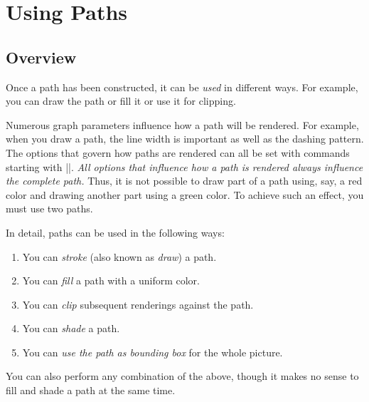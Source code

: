 %
%
%


\section{Using Paths}

\subsection{Overview}

Once a path has been constructed, it can be \emph{used} in different
ways. For example, you can draw the path or fill it or use it for
clipping.

Numerous graph parameters influence how a path will be rendered. For
example, when you draw a path, the line width is important as well as
the dashing pattern. The options that govern how paths are rendered
can all be set with commands starting with |\pgfset|. \emph{All
  options that influence how a path is rendered always influence the
  complete path.} Thus, it is not possible to draw part of a path
using, say, a red color and drawing another part using a green
color. To achieve such an effect, you must use two paths.

In detail, paths can be used in the following ways:

\begin{enumerate}
\item
  You can \emph{stroke} (also known as \emph{draw}) a path.
\item
  You can \emph{fill} a path with a uniform color.
\item
  You can \emph{clip} subsequent renderings against the path.
\item
  You can \emph{shade} a path.
\item
  You can \emph{use the path as bounding box} for the whole picture.
\end{enumerate}
You can also perform any combination of the above, though it makes no
sense to fill and shade a path at the same time.

